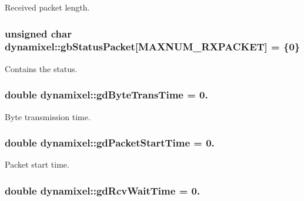 Received packet length. 

\hypertarget{a00004_aa57c86d3bbbeaf5c9d4f6bd00376b04f}{}
\subsubsection[{gb\+Status\+Packet}]{\setlength{\rightskip}{0pt plus 5cm}unsigned char dynamixel\+::gb\+Status\+Packet\mbox{[}M\+A\+X\+N\+U\+M\+\_\+\+R\+X\+P\+A\+C\+K\+E\+T\mbox{]} = \{0\}\hspace{0.3cm}{\ttfamily [private]}}\label{a00004_aa57c86d3bbbeaf5c9d4f6bd00376b04f}


Contains the status. 

\hypertarget{a00004_a2173f25c6299da7ddb37ba3d2bf1f738}{}
\subsubsection[{gd\+Byte\+Trans\+Time}]{\setlength{\rightskip}{0pt plus 5cm}double dynamixel\+::gd\+Byte\+Trans\+Time = 0.\hspace{0.3cm}{\ttfamily [private]}}\label{a00004_a2173f25c6299da7ddb37ba3d2bf1f738}


Byte transmission time. 

\hypertarget{a00004_a6c6314fb7070e6fd361e57c5de17e0ec}{}
\subsubsection[{gd\+Packet\+Start\+Time}]{\setlength{\rightskip}{0pt plus 5cm}double dynamixel\+::gd\+Packet\+Start\+Time = 0.\hspace{0.3cm}{\ttfamily [private]}}\label{a00004_a6c6314fb7070e6fd361e57c5de17e0ec}


Packet start time. 

\hypertarget{a00004_a9f47887864517d74955a2bc787ae4456}{}
\subsubsection[{gd\+Rcv\+Wait\+Time}]{\setlength{\rightskip}{0pt plus 5cm}double dynamixel\+::gd\+Rcv\+Wait\+Time = 0.\hspace{0.3cm}{\ttfamily [private]}}\label{a00004_a9f47887864517d74955a2bc787ae4456}


